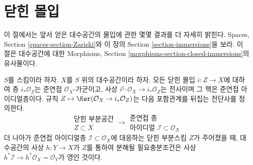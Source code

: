 \section{닫힌 몰입}
\label{section-closed-immersions}

\noindent
이 절에서는 앞서 얻은 대수공간의 몰입에 관한 몇몇 결과를
더 자세히 밝힌다. Spaces, Section \ref{spaces-section-Zariski}와
이 장의 Section \ref{section-immersions}을 보라.
이 절은 대수공간에 대한 Morphisms, Section
\ref{morphisms-section-closed-immersions}의 유사물이다.

\begin{lemma}
\label{lemma-closed-immersion-ideals}
$S$를 스킴이라 하자.
$X$를 $S$ 위의 대수공간이라 하자.
모든 닫힌 몰입 $i : Z \to X$에 대하여 층
$i_*\mathcal{O}_Z$는 준연접 $\mathcal{O}_X$-가군이고, 사상
$i^\sharp : \mathcal{O}_X \to i_*\mathcal{O}_Z$는 전사이며 그
핵은 준연접 아이디얼층이다. 규칙
$Z \mapsto \Ker(\mathcal{O}_X \to i_*\mathcal{O}_Z)$는
다음 포함관계를 뒤집는 전단사를 정의한다.
$$
\begin{matrix}
\text{닫힌 부분공간}\\
Z \subset X
\end{matrix}
\longrightarrow
\begin{matrix}
\text{준연접 층}\\
\text{아이디얼 }\mathcal{I} \subset \mathcal{O}_X
\end{matrix}
$$
더 나아가 준연접 아이디얼층 $\mathcal{I} \subset \mathcal{O}_X$에
대응하는 닫힌 부분스킴 $Z$가 주어졌을 때, 대수공간의 사상
$h : Y \to X$가 $Z$를 통하여 분해될 필요충분조건은 사상
$h^*\mathcal{I} \to h^*\mathcal{O}_X = \mathcal{O}_Y$가 영인 것이다.
\end{lemma}

